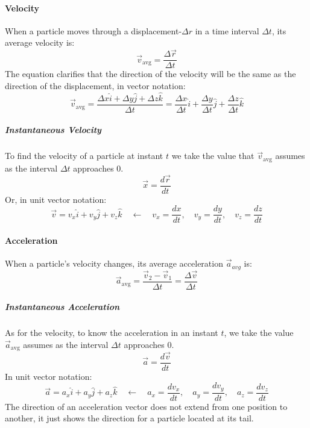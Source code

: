 \paragraph{Velocity} When a particle moves through a displacement-$\Delta r$ in a time interval $\Delta t$, its average velocity is:
\begin{equation}
\vec{v}_{\mathrm{avg}} = \frac{\Delta\vec{r}}{\Delta t}
\end{equation}
The equation clarifies that the direction of the velocity will be the same as the direction of the displacement, in vector notation:
\begin{equation}
\vec{v}_{\mathrm{avg}} = \frac{\Delta x \hat{i} + \Delta y \hat{j} + \Delta z \hat{k}}{\Delta t} = \frac{\Delta x}{\Delta t} \hat{i} + \frac{\Delta y}{\Delta t} \hat{j} + \frac{\Delta z}{\Delta t} \hat{k}
\end{equation}
\subparagraph{Instantaneous Velocity} To find the velocity of a particle at instant $t$ we take the value that $\vec{v}_{\mathrm{avg}}$ assumes as the interval $\Delta t$ approaches $0$.
\begin{equation}
\vec{x} = \frac{d\vec{r}}{dt}
\end{equation}
Or, in unit vector notation:
\begin{equation}
\vec{v} = v_x \hat{i} + v_y \hat{j} + v_z \hat{k}\quad \leftarrow\quad v_x= \frac{dx}{dt},\quad v_y= \frac{dy}{dt},\quad v_z= \frac{dz}{dt}
\end{equation}
\paragraph{Acceleration} When a particle's velocity changes, its average acceleration $\vec{a}_{avg}$ is:
\begin{equation}
\vec{a}_{\mathrm{avg}} = \frac{\vec{v}_2 - \vec{v}_1}{\Delta t} = \frac{\Delta \vec{v} }{\Delta t}
\end{equation}
\subparagraph{Instantaneous Acceleration} As for the velocity, to know the acceleration in an instant $t$, we take the value $\vec{a}_{\mathrm{avg}}$ assumes as the interval $\Delta{t}$ approaches $0$.
\begin{equation}
\vec{a} = \frac{d\vec{v}}{dt}
\end{equation}
In unit vector notation:
\begin{equation}
\vec{a} = a_x \hat{i} + a_y \hat{j} + a_z \hat{k}\quad\leftarrow\quad a_x = \frac{dv_x}{dt},\quad a_y = \frac{dv_y}{dt},\quad a_z = \frac{dv_z}{dt}
\end{equation}
The direction of an acceleration vector does not extend from one position to another, it just shows the direction for a particle located at its tail.
